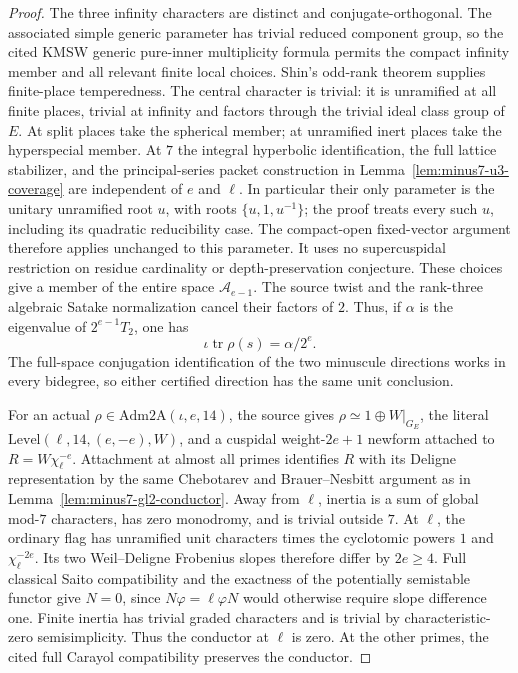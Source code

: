 \documentclass[11pt,a4paper]{article}
\theoremstyle{definition}
\begin{document}
\begin{proof}
The three infinity characters are distinct and conjugate-orthogonal.
The associated simple generic parameter has trivial reduced
component group, so the cited KMSW generic pure-inner multiplicity
formula permits the compact infinity member and all relevant
finite local choices. Shin's odd-rank theorem supplies finite-place
temperedness. The central character is trivial: it is unramified
at all finite places, trivial at infinity and factors through the
trivial ideal class group of $E$.
At split places take the spherical member; at unramified inert
places take the hyperspecial member. At $7$ the integral hyperbolic
identification, the full lattice stabilizer, and the principal-series
packet construction in Lemma~\ref{lem:minus7-u3-coverage} are
independent of $e$ and $\ell$. In particular their only parameter
is the unitary unramified root $u$, with roots
$\{u,1,u^{-1}\}$; the proof treats every such $u$, including its
quadratic reducibility case. The compact-open fixed-vector argument
therefore applies unchanged to this parameter. It uses no
supercuspidal restriction on residue cardinality or depth-preservation
conjecture. These choices give a member of the entire space
$\mathcal A_{e-1}$.
The source twist and the rank-three algebraic Satake normalization
cancel their factors of $2$. Thus, if $\alpha$ is the eigenvalue of
$2^{e-1}T_2$, one has
\[
                  \iota\operatorname{tr}\rho(s)=\alpha/2^e.
 \tag{GS7.3}
\]
The full-space conjugation identification of the two minuscule
directions works in every bidegree, so either certified direction
has the same unit conclusion.

For an actual $\rho\in\mathrm{Adm2A}(\iota,e,14)$, the source
gives $\rho\simeq1\oplus W|_{G_E}$, the literal
$\mathrm{Level}(\ell,14,(e,-e),W)$, and a cuspidal weight-$2e+1$
newform attached to $R=W\chi_\ell^{-e}$. Attachment at almost all
primes identifies $R$ with its Deligne representation by the same
Chebotarev and Brauer--Nesbitt argument as in
Lemma~\ref{lem:minus7-gl2-conductor}.
Away from $\ell$, inertia is a sum of global mod-$7$ characters,
has zero monodromy, and is trivial outside $7$.
At $\ell$, the ordinary flag has unramified unit characters times
the cyclotomic powers $1$ and $\chi_\ell^{-2e}$. Its two
Weil--Deligne Frobenius slopes therefore differ by $2e\geq4$.
Full classical Saito compatibility and the exactness of the
potentially semistable functor give $N=0$, since
$N\varphi=\ell\varphi N$ would otherwise require slope difference
one. Finite inertia has trivial graded characters and is trivial
by characteristic-zero semisimplicity. Thus the conductor at
$\ell$ is zero. At the other primes, the cited full Carayol
compatibility preserves the conductor.


\end{proof}
\end{document}
